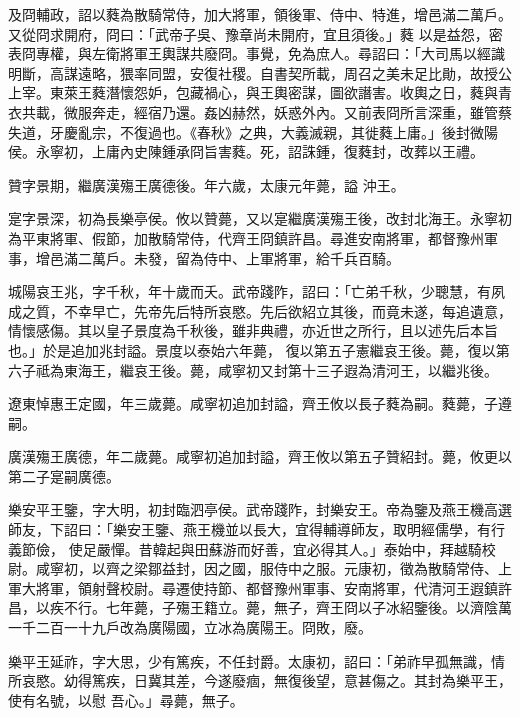\begin{pinyinscope}
 及冏輔政，詔以蕤為散騎常侍，加大將軍，領後軍、侍中、特進，增邑滿二萬戶。又從冏求開府，冏曰：「武帝子吳、豫章尚未開府，宜且須後。」蕤
 以是益怨，密表冏專權，與左衛將軍王輿謀共廢冏。事覺，免為庶人。尋詔曰：「大司馬以經識明斷，高謀遠略，猥率同盟，安復社稷。自書契所載，周召之美未足比勛，故授公上宰。東萊王蕤潛懷怨妒，包藏禍心，與王輿密謀，圖欲譖害。收輿之日，蕤與青衣共載，微服奔走，經宿乃還。姦凶赫然，妖惑外內。又前表冏所言深重，雖管蔡失道，牙慶亂宗，不復過也。《春秋》之典，大義滅親，其徙蕤上庸。」後封微陽侯。永寧初，上庸內史陳鍾承冏旨害蕤。死，詔誅鍾，復蕤封，改葬以王禮。



 贊字景期，繼廣漢殤王廣德後。年六歲，太康元年薨，謚
 沖王。



 寔字景深，初為長樂亭侯。攸以贊薨，又以寔繼廣漢殤王後，改封北海王。永寧初為平東將軍、假節，加散騎常侍，代齊王冏鎮許昌。尋進安南將軍，都督豫州軍事，增邑滿二萬戶。未發，留為侍中、上軍將軍，給千兵百騎。



 城陽哀王兆，字千秋，年十歲而夭。武帝踐阼，詔曰：「亡弟千秋，少聰慧，有夙成之質，不幸早亡，先帝先后特所哀愍。先后欲紹立其後，而竟未遂，每追遺意，情懷感傷。其以皇子景度為千秋後，雖非典禮，亦近世之所行，且以述先后本旨也。」於是追加兆封謚。景度以泰始六年薨，
 復以第五子憲繼哀王後。薨，復以第六子祗為東海王，繼哀王後。薨，咸寧初又封第十三子遐為清河王，以繼兆後。



 遼東悼惠王定國，年三歲薨。咸寧初追加封謚，齊王攸以長子蕤為嗣。蕤薨，子遵嗣。



 廣漢殤王廣德，年二歲薨。咸寧初追加封謚，齊王攸以第五子贊紹封。薨，攸更以第二子寔嗣廣德。



 樂安平王鑒，字大明，初封臨泗亭侯。武帝踐阼，封樂安王。帝為鑒及燕王機高選師友，下詔曰：「樂安王鑒、燕王機並以長大，宜得輔導師友，取明經儒學，有行義節儉，
 使足嚴憚。昔韓起與田蘇游而好善，宜必得其人。」泰始中，拜越騎校尉。咸寧初，以齊之梁鄒益封，因之國，服侍中之服。元康初，徵為散騎常侍、上軍大將軍，領射聲校尉。尋遷使持節、都督豫州軍事、安南將軍，代清河王遐鎮許昌，以疾不行。七年薨，子殤王籍立。薨，無子，齊王冏以子冰紹鑒後。以濟陰萬一千二百一十九戶改為廣陽國，立冰為廣陽王。冏敗，廢。



 樂平王延祚，字大思，少有篤疾，不任封爵。太康初，詔曰：「弟祚早孤無識，情所哀愍。幼得篤疾，日冀其差，今遂廢痼，無復後望，意甚傷之。其封為樂平王，使有名號，以慰
 吾心。」尋薨，無子。




\end{pinyinscope}
